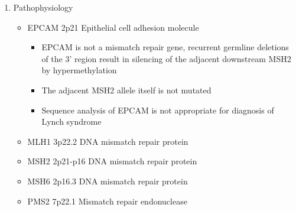 \documentclass[12pt]{scrartcl}
\begin{document}
\begin{enumerate}
\item Pathophysiology
\label{sec:org36e5020}
\begin{itemize}
\item EPCAM 2p21	Epithelial cell adhesion molecule
\begin{itemize}
\item EPCAM is not a mismatch repair gene, recurrent germline deletions
of the 3' region result in silencing of the adjacent downstream
MSH2 by hypermethylation
\item The adjacent MSH2 allele itself is not mutated
\item Sequence analysis of EPCAM is not appropriate for diagnosis of
Lynch syndrome
\end{itemize}
\item MLH1	3p22​.2	DNA mismatch repair protein
\item MSH2	2p21-p16 DNA mismatch repair protein
\item MSH6	2p16​.3	DNA mismatch repair protein
\item PMS2	7p22​.1	Mismatch repair endonuclease
\end{itemize}
\end{enumerate}
\end{document}
